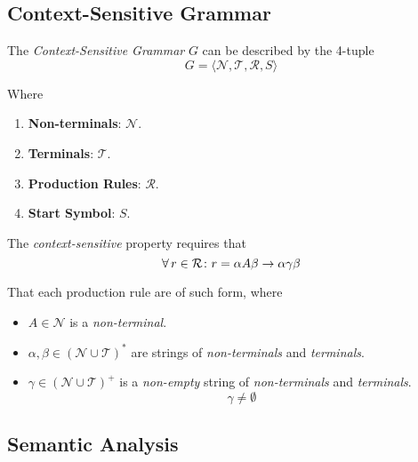 \subsection{Context-Sensitive Grammar}

\begin{definition}
    The \textit{Context-Sensitive Grammar} $G$ can be described by the 4-tuple
    \begin{equation}
        G = \langle
            \mathcal{N},
            \mathcal{T},
            \mathcal{R},
            S
        \rangle
    \end{equation}
    
    Where
    \begin{enumerate}
        \item \textbf{Non-terminals}: $\mathcal{N}$.
        \item \textbf{Terminals}: $\mathcal{T}$.
        \item \textbf{Production Rules}: $\mathcal{R}$.
        \item \textbf{Start Symbol}: $S$.
    \end{enumerate}
    
    The \textit{context-sensitive} property requires that
    \begin{equation}
        \operatorname{\forall} r \in \mathcal{R} \colon r = \alpha A \beta \to \alpha \gamma \beta
    \end{equation}
    
    That each production rule are of such form, where
    \begin{itemize}
        \item $A \in \mathcal{N}$ is a \textit{non-terminal}.
        \item $\alpha, \beta \in (\mathcal{N} \cup \mathcal{T})^\ast$ are strings of \textit{non-terminals} and \textit{terminals}.
        \item $\gamma \in (\mathcal{N} \cup \mathcal{T})^+$ is a \textit{non-empty} string of \textit{non-terminals} and \textit{terminals}.
        \begin{equation}
            \gamma \ne \emptyset
        \end{equation}
    \end{itemize}
\end{definition}

\subsection{Semantic Analysis}

